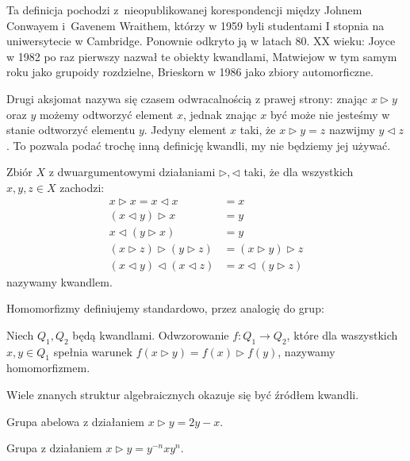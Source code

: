 Ta definicja pochodzi z~nieopublikowanej korespondencji między Johnem Conwayem i~Gavenem Wraithem, którzy w 1959 byli studentami I stopnia na uniwersytecie w Cambridge.
Ponownie odkryto ją w latach 80. XX wieku: Joyce w 1982 po raz pierwszy nazwał te obiekty kwandlami, Matwiejow w tym samym roku jako grupoidy rozdzielne, Brieskorn w 1986 jako zbiory automorficzne.

Drugi aksjomat nazywa się czasem odwracalnością z prawej strony: znając $x \triangleright y$ oraz $y$ możemy odtworzyć element $x$, jednak znając $x$ być może nie jesteśmy w stanie odtworzyć elementu $y$.
Jedyny element $x$ taki, że $x \triangleright y = z$ nazwijmy $y \triangleleft z$.
To pozwala podać trochę inną definicję kwandli, my nie będziemy jej używać.

\begin{definition}
    Zbiór $X$ z dwuargumentowymi działaniami $\triangleright, \triangleleft$ taki, że dla wszystkich $x, y, z \in X$ zachodzi:
    \begin{align*}
    x \triangleright x = x \triangleleft x & = x \\
    (x \triangleleft y) \triangleright x & = y \\
    x \triangleleft (y \triangleright x) & = y \\
     (x \triangleright z) \triangleright (y \triangleright z) & = (x \triangleright y) \triangleright z \\
    (x \triangleleft y) \triangleleft (x \triangleleft z) & = x \triangleleft (y \triangleright z)
    \end{align*}
    nazywamy kwandlem.
\end{definition}

Homomorfizmy definiujemy standardowo, przez analogię do grup:

\begin{definition}
    Niech $Q_1, Q_2$ będą kwandlami.
    Odwzorowanie $f \colon Q_1 \to Q_2$, które dla waszystkich $x,y \in Q_1$ spełnia warunek $f(x \triangleright y) = f(x) \triangleright f(y)$, nazywamy homomorfizmem.
\end{definition}

Wiele znanych struktur algebraicznych okazuje się być źródłem kwandli.

\begin{example}
    Grupa abelowa z działaniem $x \triangleright y = 2y - x$.
\end{example}

\begin{example}
    Grupa z działaniem $x \triangleright y = y^{-n} x y^n$.
\end{example}

